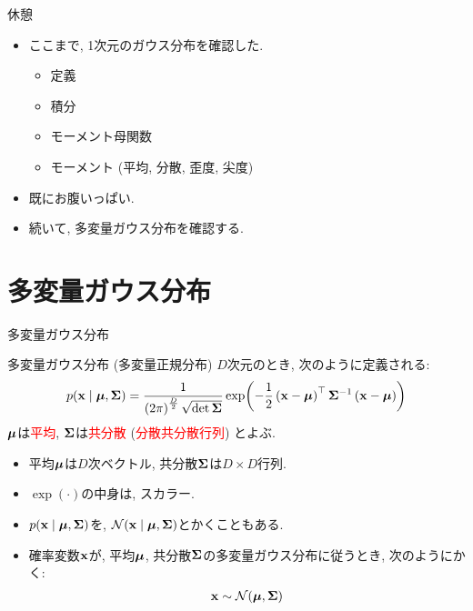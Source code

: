 \documentclass[dvipdfmx,notheorems,t]{beamer}
\begin{document}
\begin{frame}{休憩}
\begin{itemize}
  \item ここまで, 1次元のガウス分布を確認した.
  \begin{itemize}
    \item 定義
    \item 積分
    \item モーメント母関数
    \item モーメント (平均, 分散, 歪度, 尖度)
  \end{itemize}
  \item 既にお腹いっぱい.
  \item 続いて, 多変量ガウス分布を確認する.
\end{itemize}
\end{frame}

\section{多変量ガウス分布}

\begin{frame}{多変量ガウス分布}
\begin{block}{多変量ガウス分布 (多変量正規分布)}
  $D$次元のとき, 次のように定義される:
  \begin{align*}
    p(\vb{x} \mid \vb*{\mu}, \vb{\Sigma})
      = \frac{1}{\left( 2\pi \right)^\frac{D}{2} \sqrt{\det \vb{\Sigma}}}
        \exp(-\frac{1}{2} \left( \vb{x} - \vb*{\mu} \right)^\top \vb{\Sigma}^{-1}
        \left( \vb{x} - \vb*{\mu} \right))
  \end{align*}
  $\vb*{\mu}$は\textcolor{red}{平均}, $\vb{\Sigma}$は\textcolor{red}{共分散} (\textcolor{red}{分散共分散行列}) とよぶ.
\end{block}

\begin{itemize}
  \item 平均$\vb*{\mu}$は$D$次ベクトル, 共分散$\vb{\Sigma}$は$D \times D$行列.
  \item $\exp(\cdot)$の中身は, スカラー.
  \item $p(\vb{x} \mid \vb*{\mu}, \vb{\Sigma})$を, $\mathcal{N}(\vb{x} \mid \vb*{\mu}, \vb{\Sigma})$とかくこともある.
  \item 確率変数$\vb{x}$が, 平均$\vb*{\mu}$, 共分散$\vb{\Sigma}$の多変量ガウス分布に従うとき, 次のようにかく:
  \begin{align*}
    \vb{x} \sim \mathcal{N}(\vb*{\mu}, \vb{\Sigma})
  \end{align*}
\end{itemize}
\end{frame}
\end{document}
